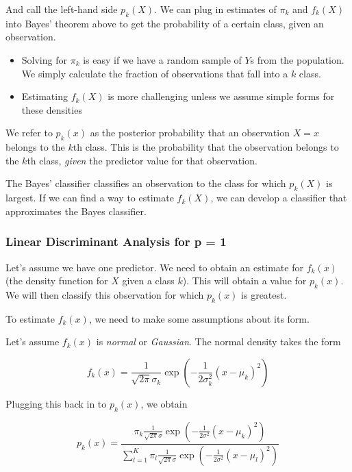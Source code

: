 \documentclass[
]{article}
\providecommand{\tightlist}{%
  \setlength{\itemsep}{0pt}\setlength{\parskip}{0pt}}
\begin{document}
And call the left-hand side \(p_k(X)\). We can plug in estimates of
\(\pi_k\) and \(f_k(X)\) into Bayes' theorem above to get the
probability of a certain class, given an observation.

\begin{itemize}
\tightlist
\item
  Solving for \(\pi_k\) is easy if we have a random sample of \(Y\)s
  from the population. We simply calculate the fraction of observations
  that fall into a \(k\) class.
\item
  Estimating \(f_k(X)\) is more challenging unless we assume simple
  forms for these densities
\end{itemize}

We refer to \(p_k(x)\) as the posterior probability that an observation
\(X = x\) belongs to the \(k\)th class. This is the probability that the
observation belongs to the \(k\)th class, \emph{given} the predictor
value for that observation.

The Bayes' classifier classifies an observation to the class for which
\(p_k(X)\) is largest. If we can find a way to estimate \(f_k(X)\), we
can develop a classifier that approximates the Bayes classifier.

\hypertarget{linear-discriminant-analysis-for-p-1}{%
\subsubsection{Linear Discriminant Analysis for p =
1}\label{linear-discriminant-analysis-for-p-1}}

Let's assume we have one predictor. We need to obtain an estimate for
\(f_k(x)\) (the density function for \(X\) given a class \(k\)). This
will obtain a value for \(p_k(x)\). We will then classify this
observation for which \(p_k(x)\) is greatest.

To estimate \(f_k(x)\), we need to make some assumptions about its form.

Let's assume \(f_k(x)\) is \emph{normal} or \emph{Gaussian}. The normal
density takes the form

\[
f_{k}(x)=\frac{1}{\sqrt{2 \pi} \sigma_{k}} \exp \left(-\frac{1}{2 \sigma_{k}^{2}}\left(x-\mu_{k}\right)^{2}\right)
\]

Plugging this back in to \(p_k(x)\), we obtain

\[
p_{k}(x)=\frac{\pi_{k} \frac{1}{\sqrt{2 \pi} \sigma} \exp \left(-\frac{1}{2 \sigma^{2}}\left(x-\mu_{k}\right)^{2}\right)}{\sum_{l=1}^{K} \pi_{l} \frac{1}{\sqrt{2 \pi} \sigma} \exp \left(-\frac{1}{2 \sigma^{2}}\left(x-\mu_{l}\right)^{2}\right)}
\]
\end{document}

